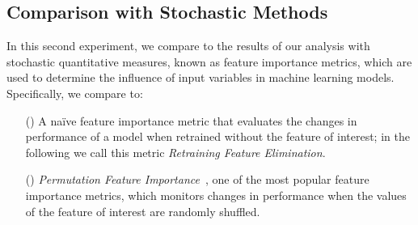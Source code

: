 \subsection{Comparison with Stochastic Methods}
%
In this second experiment, we compare to the results of our analysis with stochastic quantitative measures, known as feature importance metrics, which are used to determine the influence of input variables in machine learning models.
Specifically, we compare to:
\begin{itemize}[font=\normalfont]
  \item[(\rfe)] A na\"ive feature importance metric that evaluates the changes in performance of a model when retrained without the feature of interest; in the following we call this metric \textit{Retraining Feature Elimination}.
  \item[(\pfi)] \textit{Permutation Feature Importance}~, one of the most popular feature importance metrics, which monitors changes in performance when the values of the feature of interest are randomly shuffled.
\end{itemize}



